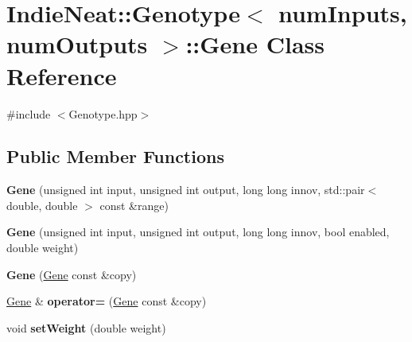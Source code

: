 \hypertarget{class_indie_neat_1_1_genotype_1_1_gene}{}\section{Indie\+Neat\+:\+:Genotype$<$ num\+Inputs, num\+Outputs $>$\+:\+:Gene Class Reference}
\label{class_indie_neat_1_1_genotype_1_1_gene}


{\ttfamily \#include $<$Genotype.\+hpp$>$}

\subsection*{Public Member Functions}
\begin{DoxyCompactItemize}
\item 
\mbox{\label{class_indie_neat_1_1_genotype_1_1_gene_a71a4944914ec3297e96f576fb7e71dae}} 
{\bfseries Gene} (unsigned int input, unsigned int output, long long innov, std\+::pair$<$ double, double $>$ const \&range)
\item 
\mbox{\label{class_indie_neat_1_1_genotype_1_1_gene_a1b1f01785939b796e2618404d25382cd}} 
{\bfseries Gene} (unsigned int input, unsigned int output, long long innov, bool enabled, double weight)
\item 
\mbox{\label{class_indie_neat_1_1_genotype_1_1_gene_a94196bcc044ed7e9c3ac9372fe51a95e}} 
{\bfseries Gene} (\hyperlink{class_indie_neat_1_1_genotype_1_1_gene}{Gene} const \&copy)
\item 
\mbox{\label{class_indie_neat_1_1_genotype_1_1_gene_a10bf052f60f2fc95748db1ce1d45a839}} 
\hyperlink{class_indie_neat_1_1_genotype_1_1_gene}{Gene} \& {\bfseries operator=} (\hyperlink{class_indie_neat_1_1_genotype_1_1_gene}{Gene} const \&copy)
\item 
\mbox{\label{class_indie_neat_1_1_genotype_1_1_gene_a10816dbb01b1612f72ee896a365dc64d}} 
void {\bfseries set\+Weight} (double weight)
\item 
\mbox{\label{class_indie_neat_1_1_genotype_1_1_gene_a21d12992bf1aaeac620d6080365f4b65}} 

\end{DoxyCompactItemize}
